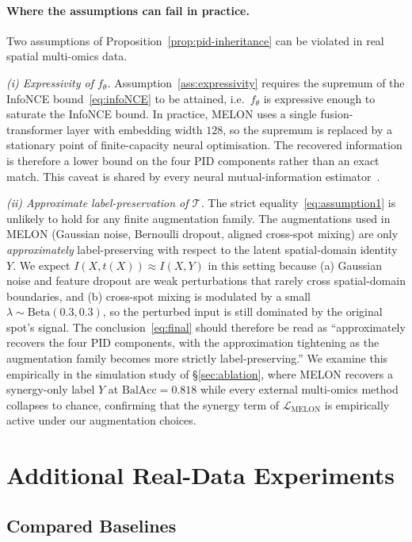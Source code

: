 \documentclass{article}
\theoremstyle{plain}
\theoremstyle{definition}
\begin{document}
\paragraph{Where the assumptions can fail in practice.}
Two assumptions of Proposition~\ref{prop:pid-inheritance} can be violated in real spatial multi-omics data.

\emph{(i) Expressivity of $f_\theta$.} Assumption~\ref{ass:expressivity} requires the supremum of the InfoNCE bound~\eqref{eq:infoNCE} to be attained, i.e.\ $f_\theta$ is expressive enough to saturate the InfoNCE bound. In practice, MELON uses a single fusion-transformer layer with embedding width $128$, so the supremum is replaced by a stationary point of finite-capacity neural optimisation. The recovered information is therefore a lower bound on the four PID components rather than an exact match. This caveat is shared by every neural mutual-information estimator~\citep{oord2018representation,tian2020contrastive}.

\emph{(ii) Approximate label-preservation of $\mathcal{T}$.} The strict equality~\eqref{eq:assumption1} is unlikely to hold for any finite augmentation family. The augmentations used in MELON (Gaussian noise, Bernoulli dropout, aligned cross-spot mixing) are only \emph{approximately} label-preserving with respect to the latent spatial-domain identity $Y$. We expect $I(X, t(X)) \approx I(X, Y)$ in this setting because (a) Gaussian noise and feature dropout are weak perturbations that rarely cross spatial-domain boundaries, and (b) cross-spot mixing is modulated by a small $\lambda \sim \mathrm{Beta}(0.3, 0.3)$, so the perturbed input is still dominated by the original spot's signal. The conclusion~\eqref{eq:final} should therefore be read as ``approximately recovers the four PID components, with the approximation tightening as the augmentation family becomes more strictly label-preserving.'' We examine this empirically in the simulation study of \S\ref{sec:ablation}, where MELON recovers a synergy-only label $Y$ at $\mathrm{BalAcc} = 0.818$ while every external multi-omics method collapses to chance, confirming that the synergy term of $\mathcal{L}_{\mathrm{MELON}}$ is empirically active under our augmentation choices.

\section{Additional Real-Data Experiments}\label{app:extra-exp}

\subsection{Compared Baselines}\label{app:baselines}
\end{document}
